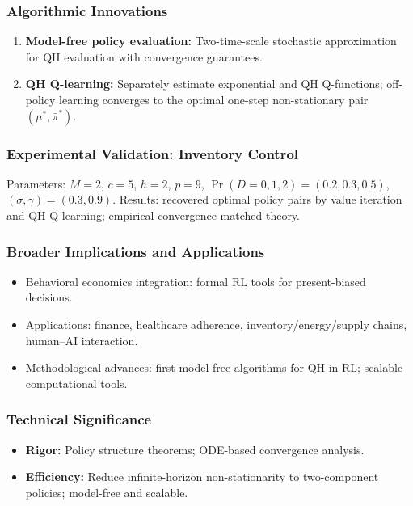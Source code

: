 \subsubsection*{Algorithmic Innovations}
\begin{enumerate}
  \item \textbf{Model-free policy evaluation:} Two-time-scale stochastic approximation for QH evaluation with convergence guarantees.
  \item \textbf{QH Q-learning:} Separately estimate exponential and QH Q-functions; off-policy learning converges to the optimal one-step non-stationary pair $(\mu^*,\bar{\pi}^*)$.
\end{enumerate}

\subsubsection*{Experimental Validation: Inventory Control}
Parameters: $M=2$, $c=5$, $h=2$, $p=9$, $\Pr(D{=}0,1,2)=(0.2,0.3,0.5)$, $(\sigma,\gamma)=(0.3,0.9)$. Results: recovered optimal policy pairs by value iteration and QH Q-learning; empirical convergence matched theory.

\subsubsection*{Broader Implications and Applications}
\begin{itemize}
  \item Behavioral economics integration: formal RL tools for present-biased decisions.
  \item Applications: finance, healthcare adherence, inventory/energy/supply chains, human–AI interaction.
  \item Methodological advances: first model-free algorithms for QH in RL; scalable computational tools.
\end{itemize}

\subsubsection*{Technical Significance}
\begin{itemize}
  \item \textbf{Rigor:} Policy structure theorems; ODE-based convergence analysis.
  \item \textbf{Efficiency:} Reduce infinite-horizon non-stationarity to two-component policies; model-free and scalable.
\end{itemize}

